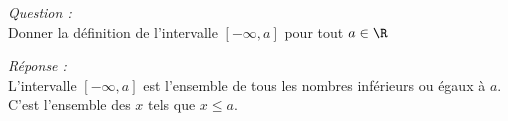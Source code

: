 \textit{Question : }\\

Donner la définition de l'intervalle $[-\infty, a]$ pour tout $a\in \R$

\textit{Réponse : }\\

L'intervalle $[-\infty , a]$ est l'ensemble de tous les nombres inférieurs ou égaux à $a$. C'est l'ensemble des $x$ tels que $x\leq a$.